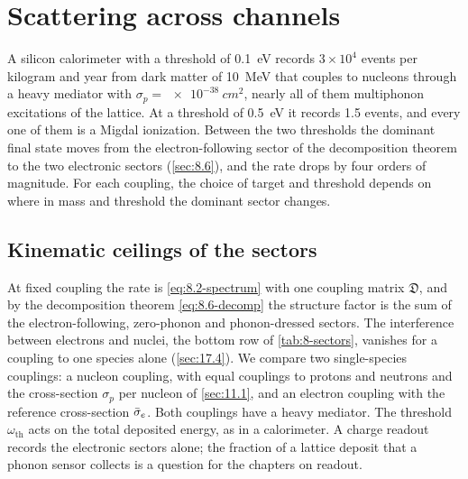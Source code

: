 \section{Scattering across channels}\label{sec:17.1}

A silicon calorimeter with a threshold of \SI{0.1}{eV} records $3\times10^4$ events per kilogram and year from dark matter of \SI{10}{MeV} that couples to nucleons through a heavy mediator with $\sigma_p = \SI{e-38}{cm^2}$, nearly all of them multiphonon excitations of the lattice. At a threshold of \SI{0.5}{eV} it records 1.5 events, and every one of them is a Migdal ionization. Between the two thresholds the dominant final state moves from the electron-following sector of the decomposition theorem to the two electronic sectors (\cref{sec:8.6}), and the rate drops by four orders of magnitude. For each coupling, the choice of target and threshold depends on where in mass and threshold the dominant sector changes.

\subsection{Kinematic ceilings of the sectors}\label{sec:17.1-ceilings}

At fixed coupling the rate is \cref{eq:8.2-spectrum} with one coupling matrix $\mathfrak{D}$, and by the decomposition theorem \cref{eq:8.6-decomp} the structure factor is the sum of the electron-following, zero-phonon and phonon-dressed sectors. The interference between electrons and nuclei, the bottom row of \cref{tab:8-sectors}, vanishes for a coupling to one species alone (\cref{sec:17.4}). We compare two single-species couplings: a nucleon coupling, with equal couplings to protons and neutrons and the cross-section $\sigma_p$ per nucleon of \cref{sec:11.1}, and an electron coupling with the reference cross-section $\bar{\sigma}_{e}$. Both couplings have a heavy mediator. The threshold $\omega_{\mathrm{th}}$ acts on the total deposited energy, as in a calorimeter. A charge readout records the electronic sectors alone; the fraction of a lattice deposit that a phonon sensor collects is a question for the chapters on readout.

